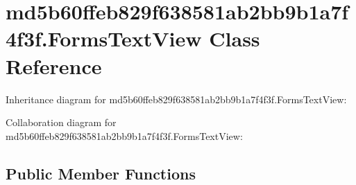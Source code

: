 \hypertarget{classmd5b60ffeb829f638581ab2bb9b1a7f4f3f_1_1_forms_text_view}{}\section{md5b60ffeb829f638581ab2bb9b1a7f4f3f.\+Forms\+Text\+View Class Reference}
\label{classmd5b60ffeb829f638581ab2bb9b1a7f4f3f_1_1_forms_text_view}


Inheritance diagram for md5b60ffeb829f638581ab2bb9b1a7f4f3f.\+Forms\+Text\+View\+:


Collaboration diagram for md5b60ffeb829f638581ab2bb9b1a7f4f3f.\+Forms\+Text\+View\+:
\subsection*{Public Member Functions}
